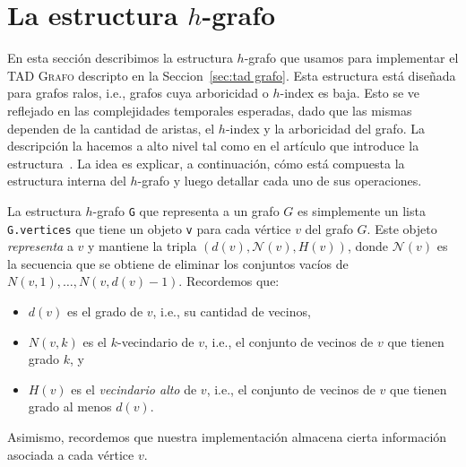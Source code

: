 \documentclass[%
    a4paper,%
    fontsize=12pt,%
    DIV=12,
    twoside,%
    openright,%
    titlepage=true,%
    headsepline,%
    toc=bibliography,%
    parskip=half,%
    cleardoublepage=empty,%
    headings=big,%
]{scrbook}
\makeatletter
\newcommand{\Grafo}{\textsc{Grafo}\xspace}
\newcommand{\Code}[1]{\lstinline[basicstyle={\ttfamily}]@#1@}
\newcommand{\N}{\mathcal{N}}
\makeatother
\begin{document}
\chapter{La estructura \texorpdfstring{$h$}{h}-grafo}
\label{sec:h-grafo}

En esta sección describimos la estructura $h$-grafo que usamos para implementar el TAD \Grafo descripto en la Seccion~\ref{sec:tad grafo}.  Esta estructura está diseñada para grafos ralos, i.e., grafos cuya arboricidad o $h$-index es baja.  Esto se ve reflejado en  las complejidades temporales esperadas, dado que las mismas dependen de la cantidad de aristas, el $h$-index y la arboricidad del grafo.  La descripción la hacemos a alto nivel tal como en el artículo que introduce la estructura~\cite{LinSoulignacSzwarcfiterTCS2012}.  La idea es explicar, a continuación, cómo está compuesta la estructura interna del $h$-grafo y luego detallar cada uno de sus operaciones.


La estructura $h$-grafo \Code{G} que representa a un grafo $G$ es simplemente un lista \Code{G.vertices} que tiene un objeto \Code{v} para cada vértice $v$ del grafo $G$.  Este objeto \emph{representa} a $v$ y mantiene la tripla $(d(v), \N(v), H(v))$, donde $\N(v)$ es la secuencia que se obtiene de eliminar los conjuntos vacíos de $N(v,1), \ldots, N(v, d(v)-1)$.  Recordemos que:   
\begin{itemize}
\item $d(v)$ es el grado de $v$, i.e., su cantidad de vecinos,
\item $N(v,k)$ es el $k$-vecindario de $v$, i.e., el conjunto de vecinos de $v$ que tienen grado $k$, y
\item $H(v)$ es el \emph{vecindario alto} de $v$, i.e., el conjunto de vecinos de $v$ que tienen grado al menos $d(v)$.
\end{itemize}
Asimismo, recordemos que nuestra implementación almacena cierta información asociada a cada vértice $v$.
\end{document}
